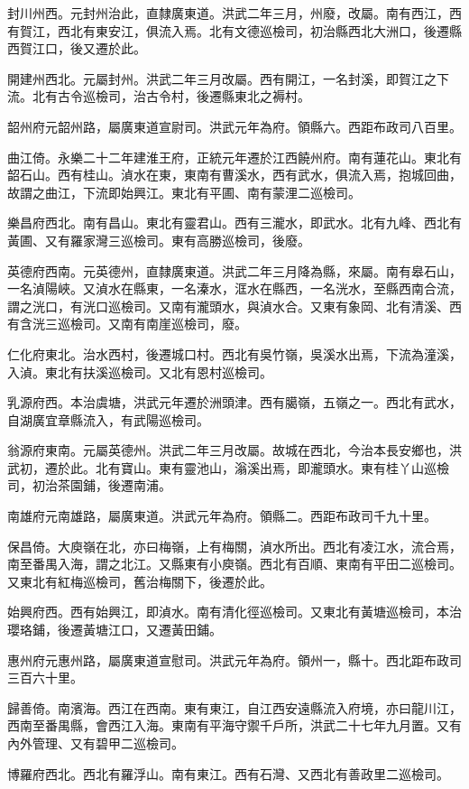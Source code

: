 封川州西。元封州治此，直隸廣東道。洪武二年三月，州廢，改屬。南有西江，西有賀江，西北有東安江，俱流入焉。北有文德巡檢司，初治縣西北大洲口，後遷縣西賀江口，後又遷於此。

開建州西北。元屬封州。洪武二年三月改屬。西有開江，一名封溪，即賀江之下流。北有古令巡檢司，治古令村，後遷縣東北之褥村。

韶州府元韶州路，屬廣東道宣尉司。洪武元年為府。領縣六。西距布政司八百里。

曲江倚。永樂二十二年建淮王府，正統元年遷於江西饒州府。南有蓮花山。東北有韶石山。西有桂山。湞水在東，東南有曹溪水，西有武水，俱流入焉，抱城回曲，故謂之曲江，下流即始興江。東北有平圃、南有蒙浬二巡檢司。

樂昌府西北。南有昌山。東北有靈君山。西有三瀧水，即武水。北有九峰、西北有黃圃、又有羅家灣三巡檢司。東有高勝巡檢司，後廢。

英德府西南。元英德州，直隸廣東道。洪武二年三月降為縣，來屬。南有皋石山，一名湞陽峽。又湞水在縣東，一名溱水，洭水在縣西，一名洸水，至縣西南合流，謂之洸口，有洸口巡檢司。又南有瀧頭水，與湞水合。又東有象岡、北有清溪、西有含洸三巡檢司。又南有南崖巡檢司，廢。

仁化府東北。治水西村，後遷城口村。西北有吳竹嶺，吳溪水出焉，下流為潼溪，入湞。東北有扶溪巡檢司。又北有恩村巡檢司。

乳源府西。本治虞塘，洪武元年遷於洲頭津。西有臈嶺，五嶺之一。西北有武水，自湖廣宜章縣流入，有武陽巡檢司。

翁源府東南。元屬英德州。洪武二年三月改屬。故城在西北，今治本長安鄉也，洪武初，遷於此。北有寶山。東有靈池山，滃溪出焉，即瀧頭水。東有桂丫山巡檢司，初治茶園鋪，後遷南浦。

南雄府元南雄路，屬廣東道。洪武元年為府。領縣二。西距布政司千九十里。

保昌倚。大庾嶺在北，亦曰梅嶺，上有梅關，湞水所出。西北有凌江水，流合焉，南至番禺入海，謂之北江。又縣東有小庾嶺。西北有百順、東南有平田二巡檢司。又東北有紅梅巡檢司，舊治梅關下，後遷於此。

始興府西。西有始興江，即湞水。南有清化徑巡檢司。又東北有黃塘巡檢司，本治瓔珞鋪，後遷黃塘江口，又遷黃田鋪。

惠州府元惠州路，屬廣東道宣慰司。洪武元年為府。領州一，縣十。西北距布政司三百六十里。

歸善倚。南濱海。西江在西南。東有東江，自江西安遠縣流入府境，亦曰龍川江，西南至番禺縣，會西江入海。東南有平海守禦千戶所，洪武二十七年九月置。又有內外管理、又有碧甲二巡檢司。

博羅府西北。西北有羅浮山。南有東江。西有石灣、又西北有善政里二巡檢司。

